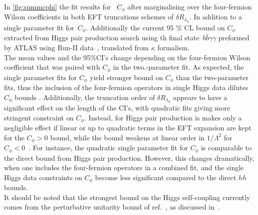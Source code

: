 \par
In \autoref{fig:summcphi} the fit results for~ $C_\phi$ after marginalising over  the four-fermion Wilson coefficients in both EFT truncations schemes of $\delta R_{\lambda_3}$.  In addition to a single parameter fit for~$C_{\phi}$. Additionally the current 95 \% CL bound on $C_\phi$ extracted from Higgs pair production search using th final state~$b\bar{b} \gamma \gamma$ preformed by ATLAS using Run-II data~\cite{ATLAS:2021jki}, translated from $\kappa$ formalism.\\ The mean values and the 95\%CI's change depending on the four-fermion Wilson coefficient that was paired with $C_\phi$ in the two.-parameter fit. As expected, the single parameter fits for $C_\phi$ yield stronger bound on $C_\phi$ than the two-parameter fits, thus the inclusion of the four-fermion operators in single Higgs data dilutes $C_\phi$ bounds .  Additionally, the truncation order of  $\delta R_{\lambda_3}$ appears to have a significant effect on the length of the CI's, with quadratic fits giving more stringent constraint on $C_\phi$. Instead, for Higgs pair production  is makes only a negligible effect  if linear or up to quadratic terms in the EFT expansion are kept  for the $C_\phi>0$ bound, while the bound weakens at linear order in $1/\Lambda^2$ for $C_\phi<0$~\cite{IML}. For instance, the quadratic single parameter fit for $C_\phi$ is comparable to the direct bound from Higgs pair production. However, this changes dramatically, when one includes the four-fermion operators in a combined fit, and the single Higgs data constraints on $C_\phi$ become less significant compared to the  direct $hh$ bounds. \\
It should be noted that the strongest bound on the Higgs self-coupling currently comes from the perturbative unitarity bound of ref.~\cite{DiLuzio:2017tfn}, as discussed in~.
